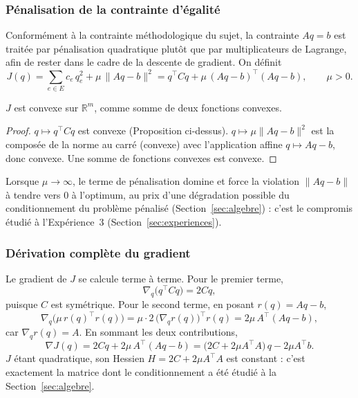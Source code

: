 \documentclass[11pt]{ama-article}
\begin{document}
\subsubsection{Pénalisation de la contrainte d'égalité}

Conformément à la contrainte méthodologique du sujet, la contrainte $Aq=b$ est traitée par
pénalisation quadratique plutôt que par multiplicateurs de Lagrange, afin de rester dans le
cadre de la descente de gradient. On définit
\begin{equation}
J(q) = \sum_{e\in E} c_e\, q_e^2 + \mu\,\|Aq-b\|^2 = q^\top C q + \mu\,(Aq-b)^\top(Aq-b),
\qquad \mu>0.
\label{eq:J-penalise}
\end{equation}

\begin{proposition}
$J$ est convexe sur $\mathbb{R}^m$, comme somme de deux fonctions convexes.
\end{proposition}

\begin{proof}
$q\mapsto q^\top Cq$ est convexe (Proposition ci-dessus). $q\mapsto \mu\|Aq-b\|^2$ est la
composée de la norme au carré (convexe) avec l'application affine $q\mapsto Aq-b$, donc convexe.
Une somme de fonctions convexes est convexe.
\end{proof}

Lorsque $\mu\to\infty$, le terme de pénalisation domine et force la violation
$\|Aq-b\|$ à tendre vers $0$ à l'optimum, au prix d'une dégradation possible du
conditionnement du problème pénalisé (Section~\ref{sec:algebre}) : c'est le compromis étudié à
l'Expérience~3 (Section~\ref{sec:experiences}).

\subsubsection{Dérivation complète du gradient}

Le gradient de $J$ se calcule terme à terme. Pour le premier terme,
\begin{equation}
\nabla_q\big(q^\top Cq\big) = 2Cq,
\end{equation}
puisque $C$ est symétrique. Pour le second terme, en posant $r(q)=Aq-b$,
\begin{equation}
\nabla_q\big(\mu\, r(q)^\top r(q)\big)
= \mu \cdot 2\, \big(\nabla_q r(q)\big)^\top r(q)
= 2\mu\, A^\top (Aq-b),
\end{equation}
car $\nabla_q r(q) = A$. En sommant les deux contributions,
\begin{equation}
\boxed{\nabla J(q) = 2Cq + 2\mu\, A^\top(Aq-b) = \big(2C+2\mu A^\top A\big)\,q - 2\mu A^\top b.}
\label{eq:gradient-J}
\end{equation}
$J$ étant quadratique, son Hessien $H=2C+2\mu A^\top A$ est constant : c'est exactement la
matrice dont le conditionnement a été étudié à la Section~\ref{sec:algebre}.
\end{document}
